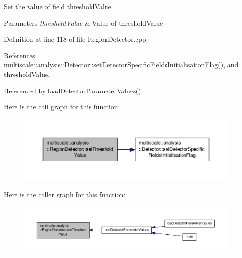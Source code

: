 Set the value of field threshold\-Value. 


\begin{DoxyParams}{Parameters}
{\em threshold\-Value} & Value of threshold\-Value \\
\hline
\end{DoxyParams}


Definition at line 118 of file Region\-Detector.\-cpp.



References multiscale\-::analysis\-::\-Detector\-::set\-Detector\-Specific\-Fields\-Initialisation\-Flag(), and threshold\-Value.



Referenced by load\-Detector\-Parameter\-Values().



Here is the call graph for this function\-:
\nopagebreak
\begin{figure}[H]
\begin{center}
\leavevmode
\includegraphics[width=350pt]{classmultiscale_1_1analysis_1_1RegionDetector_a066e87a1f134194dabfc760d241b8ab2_cgraph}
\end{center}
\end{figure}




Here is the caller graph for this function\-:
\nopagebreak
\begin{figure}[H]
\begin{center}
\leavevmode
\includegraphics[width=350pt]{classmultiscale_1_1analysis_1_1RegionDetector_a066e87a1f134194dabfc760d241b8ab2_icgraph}
\end{center}
\end{figure}


